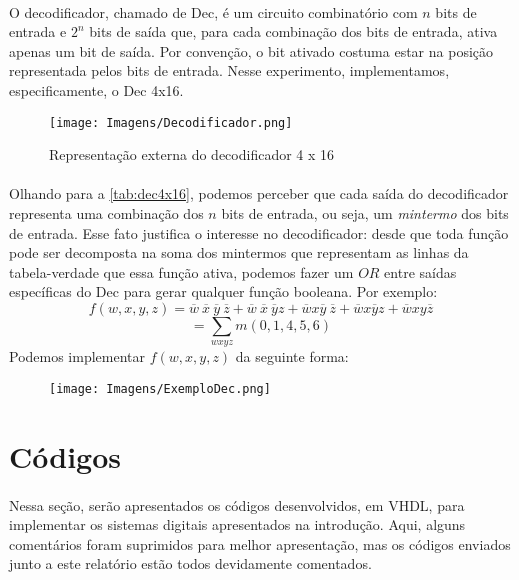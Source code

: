 \documentclass[a4paper,12pt]{article}
\begin{document}
\paragraph{}
O decodificador, chamado de Dec, é um circuito combinatório com $n$ bits de entrada e $2^n$ bits de saída que, para cada combinação dos bits de entrada, ativa apenas um bit de saída. Por convenção, o bit ativado costuma estar na posição representada pelos bits de entrada. Nesse experimento, implementamos, especificamente, o Dec 4x16.

\begin{figure}[H]
    \centering
    \texttt{[image: Imagens/Decodificador.png]}
    \caption{Representação externa do decodificador 4 x 16}
    \label{fig:dec4x16}
\end{figure}

\paragraph{}
Olhando para a \autoref{tab:dec4x16}, podemos perceber que cada saída do decodificador representa uma combinação dos $n$ bits de entrada, ou seja, um \textit{mintermo} dos bits de entrada. Esse fato justifica o interesse no decodificador: desde que toda função pode ser decomposta na soma dos mintermos que representam as linhas da tabela-verdade que essa função ativa, podemos fazer um $OR$ entre saídas específicas do Dec para gerar qualquer função booleana. Por exemplo:
\[
f(w, x, y, z) = \overline{w} \ \overline{x} \ \overline{y} \ \overline{z} + \overline{w} \ \overline{x} \ \overline{y} z + \overline{w} x \overline{y} \ \overline{z} + \overline{w}x \overline{y} z + \overline{w}xy\overline{z}
\]
\[
= \sum_{wxyz}m(0,1,4,5,6)
\]
Podemos implementar $f(w, x, y, z)$ da seguinte forma:

\begin{figure}[H]
    \centering
    \texttt{[image: Imagens/ExemploDec.png]}
    \label{fig:enter-label}
\end{figure}


\section{Códigos}
\paragraph{}
Nessa seção, serão apresentados os códigos desenvolvidos, em VHDL, para implementar os sistemas digitais apresentados na introdução. Aqui, alguns comentários foram suprimidos para melhor apresentação, mas os códigos enviados junto a este relatório estão todos devidamente comentados.
\end{document}
